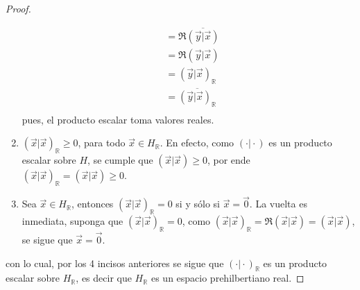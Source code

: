 \documentclass[12pt]{report}
\theoremstyle{largebreak}
\newcommand\pint[2]{\ensuremath{\left(#1\big|#2\right)}}
\newcommand\conj[1]{\ensuremath{\overline{#1}}}
\begin{document}
\begin{proof}
\begin{enumerate}
\begin{equation*}
\begin{split}
                    &=\Re\conj{\pint{\vec{y}}{\vec{x}}} \\
                    &=\Re\pint{\vec{y}}{\vec{x}} \\
                    &=\pint{\vec{y}}{\vec{x}}_{\mathbb{R}}\\
                    &=\conj{\pint{\vec{y}}{\vec{x}}_{\mathbb{R}}}\\
                \end{split}
            \end{equation*}
            pues, el producto escalar toma valores reales.
            \item $\pint{\vec{x}}{\vec{x}}_{\mathbb{R}}\geq0$, para todo $\vec{x}\in H_{\mathbb{R}}$. En efecto, como $\pint{\cdot}{\cdot}$ es un producto escalar sobre $H$, se cumple que $\pint{\vec{x}}{\vec{x}}\geq0$, por ende $\pint{\vec{x}}{\vec{x}}_{\mathbb{R}}=\pint{\vec{x}}{\vec{x}}\geq0$.
            \item Sea $\vec{x}\in H_{\mathbb{R}}$, entonces $\pint{\vec{x}}{\vec{x}}_{\mathbb{R}}=0$ si y sólo si $\vec{x}=\vec{0}$. La vuelta es inmediata, suponga que $\pint{\vec{x}}{\vec{x}}_{\mathbb{R}}=0$, como $\pint{\vec{x}}{\vec{x}}_{\mathbb{R}}=\Re\pint{\vec{x}}{\vec{x}}=\pint{\vec{x}}{\vec{x}}$, se sigue que $\vec{x}=\vec{0}$.
        \end{enumerate}
        con lo cual, por los 4 incisos anteriores se sigue que $\pint{\cdot}{\cdot}_{\mathbb{R}}$ es un producto escalar sobre $H_{\mathbb{R}}$, es decir que $H_{\mathbb{R}}$ es un espacio prehilbertiano real.
        

\end{proof}
\end{document}
